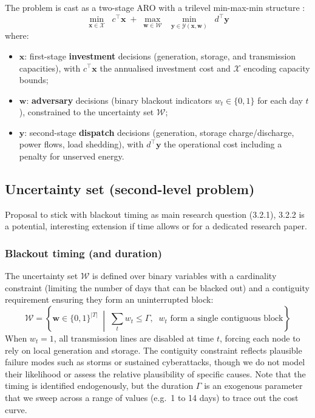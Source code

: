 \documentclass[11pt, a4paper]{article}
\begin{document}
The problem is cast as a two-stage ARO with a trilevel min-max-min structure \cite{berneckerAdaptiveRobustOptimization2025,conejoInvestmentElectricityGeneration2016}:
%
\begin{equation}\label{eq:trilevel}
  \min_{\mathbf{x} \in \mathcal{X}} \;\; c^{\top} \mathbf{x} \;+\; \max_{\mathbf{w} \in \mathcal{W}} \;\; \min_{\mathbf{y} \in \mathcal{Y}(\mathbf{x}, \mathbf{w})} \;\; d^{\top} \mathbf{y}
\end{equation}
%
where:
\begin{itemize}[nosep]
  \item $\mathbf{x}$: first-stage \textbf{investment} decisions (generation, storage, and transmission capacities), with $c^\top \mathbf{x}$ the annualised investment cost and $\mathcal{X}$ encoding capacity bounds;
  \item $\mathbf{w}$: \textbf{adversary} decisions (binary blackout indicators $w_t \in \{0,1\}$ for each day $t$), constrained to the uncertainty set $\mathcal{W}$;
  \item $\mathbf{y}$: second-stage \textbf{dispatch} decisions (generation, storage charge/discharge, power flows, load shedding), with $d^\top \mathbf{y}$ the operational cost including a penalty for unserved energy.
\end{itemize}

\subsection{Uncertainty set (second-level problem)}
Proposal to stick with blackout timing as main research question (3.2.1), 3.2.2 is a potential, interesting extension if time allows or for a dedicated research paper.
\subsubsection{Blackout timing (and duration)}
The uncertainty set $\mathcal{W}$ is defined over binary variables with a cardinality constraint (limiting the number of days that can be blacked out) and a contiguity requirement ensuring they form an uninterrupted block:
%
\begin{equation}\label{eq:unc_set}
  \mathcal{W} = \left\{ \mathbf{w} \in \{0,1\}^{|T|} \;\middle|\; \sum_{t} w_t \leq \Gamma,\;\; w_t \text{ form a single contiguous block} \right\}
\end{equation}
%
When $w_t = 1$, all transmission lines are disabled at time $t$, forcing each node to rely on local generation and storage. The contiguity constraint reflects plausible failure modes such as storms or sustained cyberattacks, though we do not model their likelihood or assess the relative plausibility of specific causes. Note that the timing is identified endogenously, but the duration $\Gamma$ is an exogenous parameter that we sweep across a range of values (e.g.\ 1 to 14 days) to trace out the cost curve.
\end{document}
